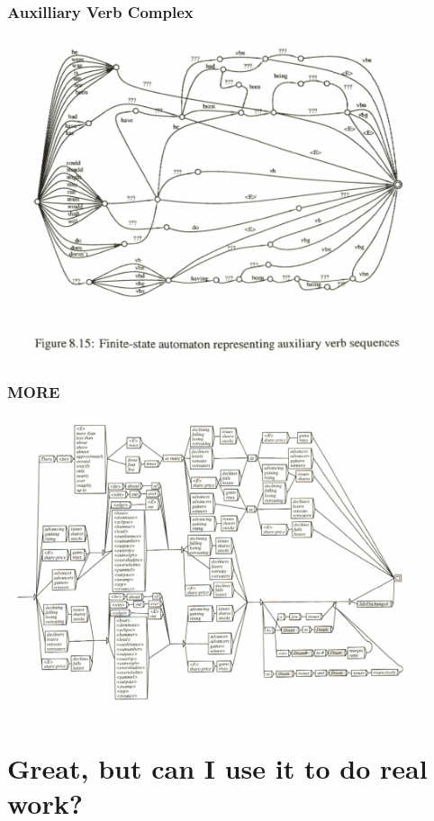 \documentclass[10pt]{beamer}
\begin{document}
\begin{frame}[fragile]
  \frametitle{Auxilliary Verb Complex}
  
  \centerline{\includegraphics[width=12cm]{fig815.png}}


\end{frame}

\begin{frame}[fragile]
  \frametitle{MORE}

  \centerline{\includegraphics[width=12cm]{fig112.png}}

\end{frame}

\section*{Great, but can I use it to do real work?}
\end{document}
